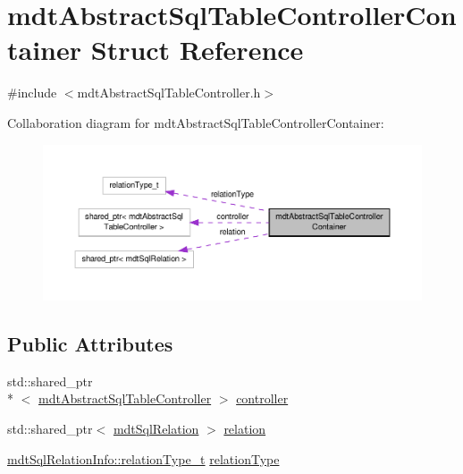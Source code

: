 \hypertarget{structmdt_abstract_sql_table_controller_container}{\section{mdt\-Abstract\-Sql\-Table\-Controller\-Container Struct Reference}
\label{structmdt_abstract_sql_table_controller_container}
}


{\ttfamily \#include $<$mdt\-Abstract\-Sql\-Table\-Controller.\-h$>$}



Collaboration diagram for mdt\-Abstract\-Sql\-Table\-Controller\-Container\-:
\nopagebreak
\begin{figure}[H]
\begin{center}
\leavevmode
\includegraphics[width=350pt]{structmdt_abstract_sql_table_controller_container__coll__graph}
\end{center}
\end{figure}
\subsection*{Public Attributes}
\begin{DoxyCompactItemize}
\item 
std\-::shared\-\_\-ptr\\*
$<$ \hyperlink{classmdt_abstract_sql_table_controller}{mdt\-Abstract\-Sql\-Table\-Controller} $>$ \hyperlink{structmdt_abstract_sql_table_controller_container_a78aed5460ebf7f78d18ac80bb855fa39}{controller}
\item 
std\-::shared\-\_\-ptr$<$ \hyperlink{classmdt_sql_relation}{mdt\-Sql\-Relation} $>$ \hyperlink{structmdt_abstract_sql_table_controller_container_ac628635f902685e4c5c15f7cc2327af9}{relation}
\item 
\hyperlink{classmdt_sql_relation_info_af36930de03b1cb16976f35987df2029e}{mdt\-Sql\-Relation\-Info\-::relation\-Type\-\_\-t} \hyperlink{structmdt_abstract_sql_table_controller_container_a95e403f88110d0b5f94b39be887226db}{relation\-Type}
\end{DoxyCompactItemize}


